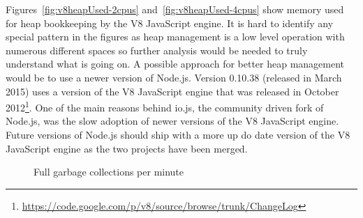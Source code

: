 \noindent
Figures~\ref{fig:v8heapUsed-2cpus} and~\ref{fig:v8heapUsed-4cpus} show memory used for heap bookkeeping by the V8 JavaScript engine. It is hard to identify any special pattern in the figures as heap management is a low level operation with numerous different spaces so further analysis would be needed to truly understand what is going on. A possible approach for better heap management would be to use a newer version of Node.js. Version 0.10.38 (released in March 2015) uses a version of the V8 JavaScript engine that was released in October 2012\footnote{\url{https://code.google.com/p/v8/source/browse/trunk/ChangeLog}}. One of the main reasons behind io.js, the community driven fork of Node.js, was the slow adoption of newer versions of the V8 JavaScript engine. Future versions of Node.js should ship with a more up do date version of the V8 JavaScript engine as the two projects have been merged.
\\
\begin{figure}[h!]
	\centering
	 \hfill
	\caption{Full garbage collections per minute}
\end{figure}

